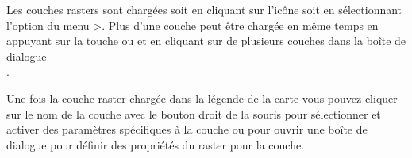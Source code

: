 Les couches rasters sont chargées soit en cliquant sur l'icône
 soit en
sélectionnant l'option du menu
>. Plus d'une couche peut être chargée en même temps en appuyant
sur la touche  ou  et en cliquant sur de
plusieurs couches dans la boîte de dialogue\\ .

Une fois la couche raster chargée dans la légende de la carte vous pouvez
cliquer sur le nom de la couche avec le bouton droit de la souris pour
sélectionner et activer des paramètres spécifiques à la couche ou pour ouvrir
une boîte de dialogue pour définir des propriétés du raster pour la couche.


